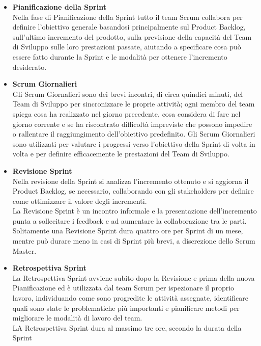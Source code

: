 \begin{itemize}
	\item \textbf{Pianificazione della Sprint} \\
	Nella fase di Pianificazione della Sprint tutto il team Scrum collabora per definire l'obiettivo generale basandosi principalmente sul Product Backlog, sull'ultimo incremento del prodotto, sulla previsione della capacità del Team di Sviluppo sulle loro prestazioni passate, aiutando a specificare cosa può essere fatto durante la Sprint e le modalità per ottenere l'incremento desiderato.
	\item \textbf{Scrum Giornalieri} \\
	Gli Scrum Giornalieri sono dei brevi incontri, di circa quindici minuti, del Team di Sviluppo per sincronizzare le proprie attività; ogni membro del team spiega cosa ha realizzato nel giorno precedente, cosa considera di fare nel giorno corrente e se ha riscontrato difficoltà impreviste che possono impedire o rallentare il raggiungimento dell'obiettivo predefinito. Gli Scrum Giornalieri sono utilizzati per valutare i progressi verso l'obiettivo della Sprint di volta in volta e per definire efficacemente le prestazioni del Team di Sviluppo.
	\item \textbf{Revisione Sprint} \\
	Nella revisione della Sprint si analizza l'incremento ottenuto e si aggiorna il Product Backlog, se necessario, collaborando con gli stakeholders per definire come ottimizzare il valore degli incrementi.
	\\
	La Revisione Sprint è un incontro informale e la presentazione dell'incremento punta a sollecitare i feedback e ad aumentare la collaborazione tra le parti.
	\\
	Solitamente una Revisione Sprint dura quattro ore per Sprint di un mese, mentre può durare meno in casi di Sprint più brevi, a discrezione dello Scrum Master.
	\item \textbf{Retrospettiva Sprint} \\
	La Retrospettiva Sprint avviene subito dopo la Revisione e prima della nuova Pianificazione ed è utilizzata dal team Scrum per ispezionare il proprio lavoro, individuando come sono progredite le attività assegnate, identificare quali sono state le problematiche più importanti e pianificare metodi per migliorare le modalità di lavoro del team.
	\\
	LA Retrospettiva Sprint dura al massimo tre ore, secondo la durata della Sprint
\end{itemize}

